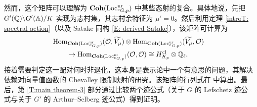 然而，这个矩阵可以理解为 ${\mathbf{Coh}}({\operatorname{Loc}}_{{}^cG,p}^{{\operatorname{ur}}})$ 中某些态射的复合。具体地说，先把 $G'({\mathbb Q})\backslash G'({\mathbb A})/K$ 实现为志村集，其志村余特征为 $\mu'=0$。然后利用定理 \ref{introT: spectral action}（以及 Satake 同构 \eqref{E: derived Satake}），该矩阵可计算为
\[
\begin{aligned}
&{\operatorname{Hom}}_{{\mathbf{Coh}}({\operatorname{Loc}}_{{}^cG,p}^{{\operatorname{ur}}})}({\mathcal O},\widetilde{V_{\mu}})\otimes  {\operatorname{Hom}}_{{\mathbf{Coh}}({\operatorname{Loc}}_{{}^cG,p}^{{\operatorname{ur}}})}(\widetilde{V_{\mu}},{\mathcal O})\\
&\qquad\to  {\operatorname{Hom}}_{{\mathbf{Coh}}({\operatorname{Loc}}_{{}^cG,p}^{{\operatorname{ur}}})}({\mathcal O},{\mathcal O})\cong H^{{\operatorname{cl}}}_{K_p}\otimes{\mathbb Q}_\ell.
\end{aligned}
\]
接着需要判定这一配对何时非退化，这本身是表示论中一个有意思的问题，其解决依赖对向量值函数的 Chevalley 限制映射的研究。该矩阵的行列式在 \cite{Xiao-Zhu-Invariants} 中算出。最后，第 \eqref{T:main theorem-3} 部分通过比较两个迹公式（关于 $G$ 的 Lefschetz 迹公式与关于 $G'$ 的 Arthur--Selberg 迹公式）得到证明。

